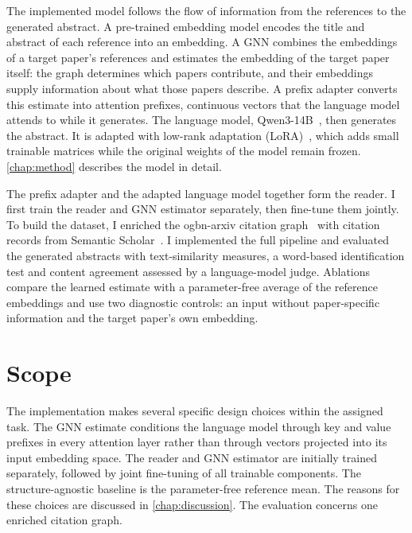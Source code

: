 The implemented model follows the flow of information from the references to the generated abstract. A pre-trained embedding model encodes the title and abstract of each reference into an embedding. A GNN combines the embeddings of a target paper's references and estimates the embedding of the target paper itself: the graph determines which papers contribute, and their embeddings supply information about what those papers describe. A prefix adapter converts this estimate into attention prefixes, continuous vectors that the language model attends to while it generates. The language model, Qwen3-14B~\cite{yang2025qwen3}, then generates the abstract. It is adapted with low-rank adaptation (LoRA)~\cite{hu2022lora}, which adds small trainable matrices while the original weights of the model remain frozen. \autoref{chap:method} describes the model in detail.

The prefix adapter and the adapted language model together form the reader. I first train the reader and GNN estimator separately, then fine-tune them jointly. To build the dataset, I enriched the ogbn-arxiv citation graph~\cite{hu2020open} with citation records from Semantic Scholar~\cite{kinney2023semantic}. I implemented the full pipeline and evaluated the generated abstracts with text-similarity measures, a word-based identification test and content agreement assessed by a language-model judge. Ablations compare the learned estimate with a parameter-free average of the reference embeddings and use two diagnostic controls: an input without paper-specific information and the target paper's own embedding.

\section{Scope}
\label{sec:scope}

The implementation makes several specific design choices within the assigned task. The GNN estimate conditions the language model through key and value prefixes in every attention layer rather than through vectors projected into its input embedding space. The reader and GNN estimator are initially trained separately, followed by joint fine-tuning of all trainable components. The structure-agnostic baseline is the parameter-free reference mean. The reasons for these choices are discussed in \autoref{chap:discussion}. The evaluation concerns one enriched citation graph.

